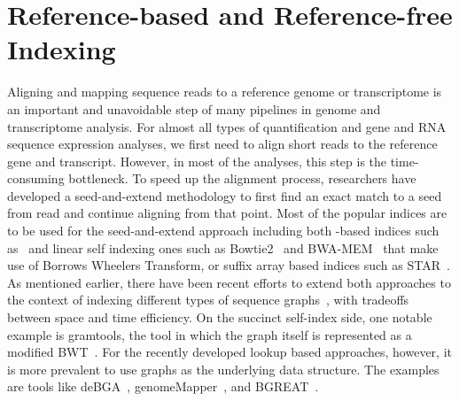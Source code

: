 \section{Reference-based and Reference-free Indexing}
\label{subsec:indexing}
Aligning and mapping sequence reads to a reference genome or transcriptome
is an important and unavoidable step
of many pipelines in genome and transcriptome analysis.
For almost all types of quantification and gene and RNA sequence expression analyses,
we first need to align short reads to the reference gene and transcript. However,
in most of the analyses, this step is the time-consuming bottleneck.
To speed up the alignment process, researchers have developed a seed-and-extend methodology
to first find an exact match to a seed from read and continue aligning from that point.
Most of the popular indices are to be used for the seed-and-extend approach including both
\kmer-based indices such as~\cite{liao2013subread}
and linear self indexing ones such as Bowtie2~\cite{langmead2012fast}
and BWA-MEM~\cite{li2013aligning} that make use of Borrows Wheelers Transform,
or suffix array based indices such as STAR~\cite{dobin2013star}.
As mentioned earlier, there have been recent efforts to extend both approaches to the context
of indexing different types of sequence graphs~\cite{paten2017genome},
with tradeoffs between space and time efficiency.
On the succinct self-index side, one notable example is gramtools, the tool in which the graph itself
is represented as a modified BWT~\cite{maciuca2016natural}.
For the recently developed \kmer lookup based approaches, however,
it is more prevalent to use graphs as the underlying data structure.
The examples are tools like deBGA~\cite{liu2016debga},
genomeMapper~\cite{schneeberger2009simultaneous}, and BGREAT~\cite{limasset2016read}.


